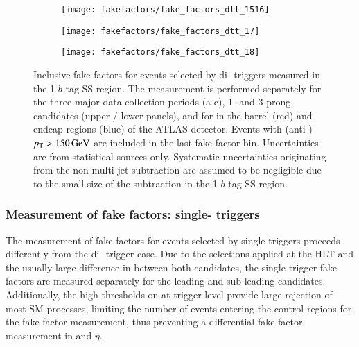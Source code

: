 \begin{figure}[htbp]
  \centering

  \begin{subfigure}{0.495\textwidth}
    \texttt{[image: fakefactors/fake\_factors\_dtt\_1516]}
  \end{subfigure}
  \begin{subfigure}{0.495\textwidth}
    \texttt{[image: fakefactors/fake\_factors\_dtt\_17]}
  \end{subfigure}

  \begin{subfigure}{0.495\textwidth}
    \texttt{[image: fakefactors/fake\_factors\_dtt\_18]}
  \end{subfigure}

  \caption{Inclusive fake factors for events selected by di-\tauhadvis
    triggers measured in the 1 $b$-tag SS region. The measurement is
    performed separately for the three major data collection periods
    (a-c), 1- and 3-prong \tauhadvis candidates (upper / lower
    panels), and for \tauhadvis in the barrel (red) and endcap regions
    (blue) of the ATLAS detector. Events with (anti-)\tauhadvis
    $p_{\text{T}} > \SI{150}{\ensuremath{\text{GeV}}}$ are included in the last fake factor
    bin. Uncertainties are from statistical sources only. Systematic
    uncertainties originating from the non-multi-jet subtraction are
    assumed to be negligible due to the small size of the subtraction
    in the 1 $b$-tag SS region.}
  \label{fig:mjfakes_fake_factors}
\end{figure}


\subsubsection{Measurement of fake factors: single-\tauhadvis
  triggers}

The measurement of fake factors for events selected by
single-\tauhadvis triggers proceeds differently from the di-\tauhadvis
trigger case. Due to the selections applied at the HLT and the usually
large difference in \pT between both \tauhadvis candidates, the
single-\tauhadvis trigger fake factors are measured separately for the
leading and sub-leading \tauhadvis candidates. Additionally, the high
\pT thresholds on \tauhadvis at trigger-level provide large rejection
of most SM processes, limiting the number of events entering the
control regions for the fake factor measurement, thus preventing a
differential fake factor measurement in \tauhadvis \pT and $\eta$.

